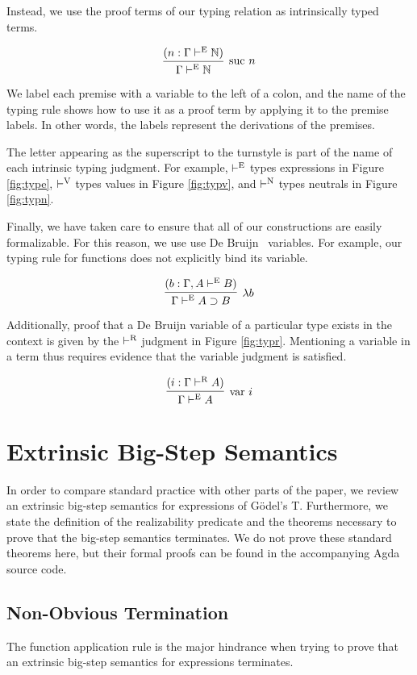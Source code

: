 \documentclass[preprint,nonatbib]{sigplanconf}
\numberwithin{subdefin}{defin}
\numberwithin{subtheorem}{theorem}
\newcommand{\reffig}[1]{Figure \ref{fig:#1}}
\def\arr{\supset}
\def\lam{\lambda}
\def\nat{\mathbb{N}}
\newcommand{\turn}[1]{\vdash^\con{#1}}
\newcommand{\con}[1]{\textmd{#1}}
\newcommand{\fun}[1]{\textmd{#1}}
\newcommand{\type}[1]{\Gamma \turn{E} #1}
\newcommand{\ctype}[2]{\Gamma , #1 \turn{E} #2}
\newcommand{\typr}[1]{\Gamma \turn{R} #1}
\begin{document}
Instead, we use the proof terms of our typing relation as
intrinsically typed terms.

$$
\infer
  [\con{suc} ~ n]
  {\type{\nat}}
{
  (n : \type{\nat})
}
$$

We label each premise with a variable to
the left of a colon, and the name of the typing rule shows how to use
it as a proof term by applying it to the premise labels. In other
words, the labels represent the derivations of the premises.

The letter appearing as the superscript to the turnstyle is part of
the name of each intrinsic typing judgment. For example, $\turn{E}$
types expressions in \reffig{type}, $\turn{V}$ types values in
\reffig{typv}, and $\turn{N}$ types neutrals in \reffig{typn}.

Finally, we have taken care to ensure that all of our constructions
are easily formalizable. For this reason, we
use use De Bruijn~\cite{TODO} variables. For example, our typing rule
for functions does not explicitly bind its variable.

$$
\infer
  [\lam b]
  {\type{A \arr B}}
{
  (b : \ctype{A}{B})
}
$$

Additionally, proof that a De Bruijn variable of a particular type
exists in the context is given by the $\turn{R}$ judgment in
\reffig{typr}. Mentioning a variable in a term thus requires evidence
that the variable judgment is satisfied.

$$
\infer
  [\fun{var} ~ i]
  {\type{A}}
{
  (i : \typr{A})
}
$$

\section{Extrinsic Big-Step Semantics}
\label{sec:epred}

In order to compare standard practice with other parts of the paper,
we review an extrinsic big-step semantics for expressions of
G{\"o}del's T. Furthermore, we state the definition of the
realizability predicate and the theorems necessary to prove
that the big-step semantics terminates. We do not prove these standard
theorems here, but their formal proofs can be found in the
accompanying Agda source code. 

\subsection{Non-Obvious Termination}

The function application rule is the major hindrance when trying
to prove that an extrinsic big-step semantics for expressions
terminates. 
\end{document}
